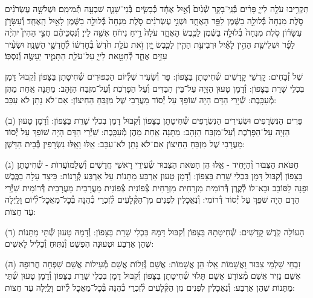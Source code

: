 \documentclass[twoside, openany, parskip=half, 11pt]{book}
\begin{document}
תַּקְרִ֥יבוּ עֹלָ֖ה לַייָ֑ פָּרִ֨ים בְּ֯נֵֽי־בָקָ֤ר שְׁ֯נַ֙יִם֙ וְ֯אַ֣יִל אֶחָ֔ד כְּ֯בָשִׂ֧ים בְּ֯נֵי־שָׁנָ֛ה שִׁבְעָ֖ה תְּ֯מִימִֽם׃
וּשְׁלֹשָׁ֣ה עֶשְׂרֹנִ֗ים סֹ֤לֶת מִנְחָה֙ בְּ֯לוּלָ֣ה בַשֶּׁ֔מֶן לַפָּ֖ר הָאֶחָ֑ד וּשְׁנֵ֣י עֶשְׂרֹנִ֗ים סֹ֤לֶת מִנְחָה֙ בְּ֯לוּלָ֣ה בַשֶּׁ֔מֶן לָאַ֖יִל הָֽאֶחָֽד׃
וְ֯עִשָּׂרֹ֣ן עִשָּׂר֗וֹן סֹ֤לֶת מִנְחָה֙ בְּ֯לוּלָ֣ה בַשֶּׁ֔מֶן לַכֶּ֖בֶשׂ הָאֶחָ֑ד עֹלָה֙ רֵ֣יחַ נִיחֹ֔חַ אִשֶּׁ֖ה לַייָ׃
וְ֯נִסְכֵּיהֶ֗ם חֲצִ֣י הַהִין֩ יִהְיֶ֨ה לַפָּ֜ר וּשְׁלִישִׁ֧ת הַהִ֣ין לָאַ֗יִל וּרְבִיעִ֥ת הַהִ֛ין לַכֶּ֖בֶשׂ יָ֑יִן זֹ֣את עֹלַ֥ת חֹ֙דֶשׁ֙ בְּ֯חׇדְשׁ֔וֹ לְ֯חׇדְשֵׁ֖י הַשָּׁנָֽה׃
וּשְׂעִ֨יר עִזִּ֥ים אֶחָ֛ד לְ֯חַטָּ֖את לַייָ֑ עַל־עֹלַ֧ת הַתָּמִ֛יד יֵעָשֶׂ֖ה וְ֯נִסְכּֽוֹ׃

%
שֶׁל זְ֯בָחִים: קׇדְשֵׁי קׇדָשִׁים שְׁ֯חִיטָתָן בַּצָּפוֹן: פָּר וְ֯שָׂעִיר שֶׁלְּ֯יוֹם הַכִּפּוּרִים שְׁ֯חִיטָתָן בַּצָּפוֹן וְ֯קִבּוּל דָּמָן בִּכְלֵי שָׁרֵת בַּצָּפוֹן: וְ֯דָמָן טָעוּן הַזָּיָה עַל־בֵּין הַבַּדִּים וְ֯עַל הַפָּרֹֽכֶת וְ֯עַל־מִזְבַּח הַזָּהָב: מַתָּנָה אַֽחַת מֵהֶן מְ֯עַכָּֽבֶת: שְׁ֯יָרֵי הַדָּם הָיָה שׁוֹפֵךְ עַל יְ֯סוֹד מַעֲרָבִי שֶׁל מִזְבֵּחַ הַחִיצוֹן: אִם־לֹא נָתַן לֹא עִכֵּב:

(ב) פָּרִים הַנִּשְׂרָפִים וּשְׂעִירִים הַנִּשְׂרָפִים שְׁ֯חִיטָתָן בַּצָּפוֹן וְ֯קִבּוּל דָּמָן בִּכְלִי שָׁרֵת בַּצָּפוֹן: וְ֯דָמָן טָעוּן הַזָּיָה עַל־הַפָּרֹֽכֶת וְ֯עַל־מִזְבַּח הַזָּהָב: מַתָּנָה אַֽחַת מֵהֶן מְ֯עַכָּֽבֶת: שִׁיְ֯רֵי הַדָּם הָיָה שׁוֹפֵךְ עַל יְ֯סוֹד מַעֲרָבִי שֶׁל מִזְבֵּחַ הַחִיצוֹן אִם־לֹא נָתַן לֹא־עִכֵּב: אֵֽלּוּ וָאֵֽלּוּ נִשְׂרָפִין בְּ֯בֵית הַדָּשֶׁן:

(ג) חַטֹּאת הַצִּבּוּר וְ֯הַיָּחִיד - אֵֽלּוּ הֵן חַטֹּאת הַצִּבּוּר שְׂ֯עִירֵי רָאשֵׁי חֳדָשִׁים וְ֯שֶׁלַּמּוׁעֲדוׂת - שְׁ֯חִיטָתָן בַּצָּפוֹן וְ֯קִבּוּל דָּמָן בִּכְלִי שָׁרֵת בַּצָּפוֹן: וְ֯דָמָן טָעוּן אַרְבַּע מַתָּנוֹת עַל אַרְבַּע קְ֯רָנוֹת: כֵּיצַד עָלָה בַכֶּֽבֶשׁ וּפָנָה לַסּוֹבֵב וּבָא־לוֹ לְ֯קֶֽרֶן דְּ֯רוֹמִית מִזְרָחִית מִזְרָחִית צְ֯פוֹנִית צְ֯פוֹנִית מַעֲרָבִית מַעֲרָבִית דְּ֯רוֹמִית שִׁיְּ֯רֵי הַדָּם הָיָה שֹׁפֵךְ עַל יְ֯סוֹד דְּ֯רוֹמִי: וְ֯נֶאֱכָלִין לִפְנִים מִן־הַקְּ֯לָעִים לְ֯זִכְרֵי כְ֯הֻנָּה בְּ֯כׇל־מַאֲכׇל־לְ֯יוֹם וָלַֽיְלָה עַד חֲצוֹת:

(ד) הָעוֹלָה קֹֽדֶשׁ קׇדָשִׁים: שְׁ֯חִיטָתָהּ בַּצָּפוֹן וְ֯קִבּוּל דָּמָהּ בִּכְלִי שָׁרֵת בַּצָּפוֹן: וְ֯דָמָהּ טָעוּן שְׁ֯תֵּי מַתָּנוֹת שֶׁהֵן אַרְבַּע וּטְעוּנָה הֶפְשֵׁט וְ֯נִתּֽוּחַ וְ֯כָלִיל לָאִשִּׁים:

(ה) זִבְחֵי שַׁלְמֵי צִבּוּר וַאֲשָׁמוֹת אֵֽלוּ הֵן אֲשָׁמוֹת: אֲשַׁם גְּ֯זֵלוֹת אֲשַׁם מְ֯עִילוֹת אֲשַׁם שִׁפְחָה חֲרוּפָה אֲשַׁם נָזִיר אֲשַׁם מְ֯צוֹרָע אָשָׁם תָּלוּי שְׁ֯חִיטָתָן בַּצָּפוֹן וְ֯קִבּוּל דָּמָן בִּכְלִי שָׁרֵת בַּצָּפוֹן וְ֯דָמָן טָעוּן שְׁ֯תֵּי מַתָּנוֹת שֶׁהֵן אַרְבַּע: וְ֯נֶאֱכָלִין לִפְנִים מִן הַקְּ֯לָעִים לְ֯זִכְרֵי כְ֯הֻנָּה בְּ֯כׇל־מַאֲכׇל לְ֯יוֹם וָלַֽיְלָה עַד חֲצוֹת:
\end{document}
